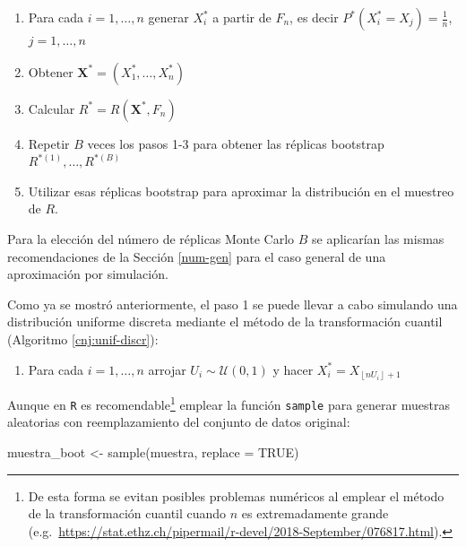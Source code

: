 \documentclass[
  10pt,
]{book}
\newenvironment{Shaded}{\begin{snugshade}}{\end{snugshade}}
\newcommand{\AttributeTok}[1]{\textcolor[rgb]{0.77,0.63,0.00}{#1}}
\newcommand{\ConstantTok}[1]{\textcolor[rgb]{0.00,0.00,0.00}{#1}}
\newcommand{\FunctionTok}[1]{\textcolor[rgb]{0.00,0.00,0.00}{#1}}
\newcommand{\NormalTok}[1]{#1}
\newcommand{\OtherTok}[1]{\textcolor[rgb]{0.56,0.35,0.01}{#1}}
\providecommand{\tightlist}{%
  \setlength{\itemsep}{0pt}\setlength{\parskip}{0pt}}
\renewcommand{\mathbf}[1]{\symbf{#1}}
\theoremstyle{break}
\theoremstyle{nonumberplain}
\let\oldfootnote\footnote
\renewcommand\footnote[1]{\oldfootnote{\hspace{2mm}#1}}
\begin{document}
\begin{enumerate}
\def\labelenumi{\arabic{enumi}.}
\item
  Para cada \(i=1,\ldots ,n\) generar \(X_i^{\ast}\) a partir de \(F_n\), es decir
  \(P^{\ast}\left( X_i^{\ast}=X_j \right) =\frac{1}{n}\), \(j=1,\ldots,n\)
\item
  Obtener \(\mathbf{X}^{\ast}=\left( X_1^{\ast},\ldots ,X_n^{\ast} \right)\)
\item
  Calcular \(R^{\ast}=R\left( \mathbf{X}^{\ast},F_n \right)\)
\item
  Repetir \(B\) veces los pasos 1-3 para obtener las réplicas bootstrap
  \(R^{\ast (1)}, \ldots, R^{\ast (B)}\)
\item
  Utilizar esas réplicas bootstrap para aproximar la distribución en el
  muestreo de \(R\).
\end{enumerate}

Para la elección del número de réplicas Monte Carlo \(B\) se aplicarían las mismas recomendaciones de la Sección \ref{num-gen} para el caso general de una aproximación por simulación.

Como ya se mostró anteriormente, el paso 1 se puede llevar a cabo simulando una distribución uniforme discreta mediante el método de la transformación cuantil (Algoritmo \ref{cnj:unif-discr}):

\begin{enumerate}
\def\labelenumi{\arabic{enumi}.}
\tightlist
\item
  Para cada \(i=1,\ldots ,n\) arrojar \(U_i\sim \mathcal{U}\left( 0,1 \right)\) y
  hacer \(X_i^{\ast}=X_{\left\lfloor nU_i\right\rfloor +1}\)
\end{enumerate}

Aunque en \texttt{R} es recomendable\footnote{De esta forma se evitan posibles problemas numéricos al emplear el método de la transformación cuantil cuando \(n\) es extremadamente grande (e.g.~\url{https://stat.ethz.ch/pipermail/r-devel/2018-September/076817.html}).} emplear la función \texttt{sample} para generar muestras aleatorias con reemplazamiento del conjunto de datos original:

\begin{Shaded}
\begin{Highlighting}[]
\NormalTok{muestra\_boot }\OtherTok{\textless{}{-}} \FunctionTok{sample}\NormalTok{(muestra, }\AttributeTok{replace =} \ConstantTok{TRUE}\NormalTok{)}
\end{Highlighting}
\end{Shaded}
\end{document}
